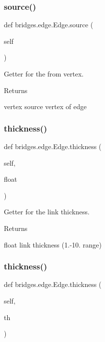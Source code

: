 \subsubsection{\texorpdfstring{source()}{source()}}
{\footnotesize\ttfamily def bridges.\+edge.\+Edge.\+source (\begin{DoxyParamCaption}\item[{}]{self }\end{DoxyParamCaption})}



Getter for the from vertex. 

\begin{DoxyReturn}{Returns}


vertex source vertex of edge 
\end{DoxyReturn}
\mbox{\label{classbridges_1_1edge_1_1_edge_a1155b5f604410cd46a81902bb8aa348b}} 
\subsubsection{\texorpdfstring{thickness()}{thickness()}\hspace{0.1cm}{\footnotesize\ttfamily [1/2]}}
{\footnotesize\ttfamily def bridges.\+edge.\+Edge.\+thickness (\begin{DoxyParamCaption}\item[{}]{self,  }\item[{}]{float }\end{DoxyParamCaption})}



Getter for the link thickness. 

\begin{DoxyReturn}{Returns}


float link thickness (1.-\/10. range) 
\end{DoxyReturn}
\mbox{\label{classbridges_1_1edge_1_1_edge_a3137a2498d08d998471efde3bc1db1b4}} 
\subsubsection{\texorpdfstring{thickness()}{thickness()}\hspace{0.1cm}{\footnotesize\ttfamily [2/2]}}
{\footnotesize\ttfamily def bridges.\+edge.\+Edge.\+thickness (\begin{DoxyParamCaption}\item[{}]{self,  }\item[{}]{th }\end{DoxyParamCaption})}




